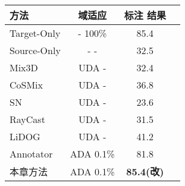 \begin{table}[H]
	\renewcommand{\arraystretch}{1}
    \centering
    \setlength{\tabcolsep}{12mm}
    \label{tab:3-4}
    \wuhao
    \begin{tabular}{lccc}
        \toprule[1.5pt]
        \textbf{方法} & \textbf{域适应} & \textbf{标注} \textbf{结果} \\
        \midrule
        Target-Only   & -       100\%           & 85.4 \\
        Source-Only   & -       -           & 32.5 \\
        Mix3D         & UDA     -   & 32.4 \\
        CoSMix        & UDA     -   & 36.8 \\
        SN              & UDA   -     & 23.6 \\
        RayCast        & UDA    -    & 31.5 \\
        LiDOG        & UDA      -       & 41.2 \\
        Annotator     & ADA     0.1\%     & 81.8 \\
        本章方法       & ADA    0.1\%      & \textbf{85.4(改)} \\
        \bottomrule[1.5pt]
    \end{tabular}
\end{table}
